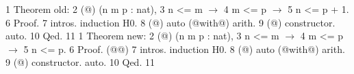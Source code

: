 1  Theorem old:
2    (@\ltacforall@) (n m p : nat),
3       n <= m $\rightarrow$
4       m <= p $\rightarrow$
5       n <= p + 1.
6  Proof.
7    intros. induction H0.
8    (@\ltacba@) auto (@with@) arith.
9    (@\ltacba@) constructor. auto.
10  Qed.
11
1  Theorem new:
2    (@\ltacforall@) (n m p : nat), 
3      n <= m $\rightarrow$ 
4      m <= p $\rightarrow$
5      n <= p.
6  Proof.  (@\vspace{-0.05cm}@)
7    intros. induction H0.
8    (@\ltacba@) auto (@with@) arith.
9    (@\ltacba@) constructor. auto.
10  Qed.
11

